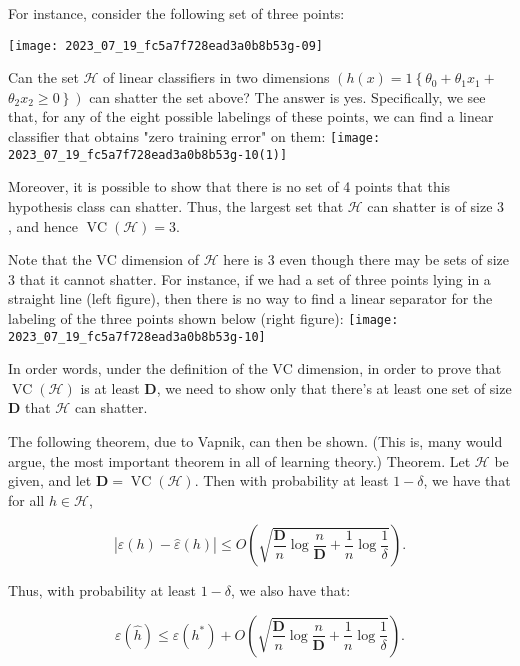 \documentclass[10pt]{article}
\begin{document}
For instance, consider the following set of three points:

\begin{center}
\texttt{[image: 2023\_07\_19\_fc5a7f728ead3a0b8b53g-09]}
\end{center}

Can the set \(\mathcal{H}\) of linear classifiers in two dimensions \(\left(h(x)=1\left\{\theta_{0}+\theta_{1} x_{1}+\right.\right.\) \(\left.\left.\theta_{2} x_{2} \geq 0\right\}\right)\) can shatter the set above? The answer is yes. Specifically, we see that, for any of the eight possible labelings of these points, we can find a linear classifier that obtains "zero training error" on them:
\texttt{[image: 2023\_07\_19\_fc5a7f728ead3a0b8b53g-10(1)]}

Moreover, it is possible to show that there is no set of 4 points that this hypothesis class can shatter. Thus, the largest set that \(\mathcal{H}\) can shatter is of size 3 , and hence \(\operatorname{VC}(\mathcal{H})=3\).

Note that the \(\mathrm{VC}\) dimension of \(\mathcal{H}\) here is 3 even though there may be sets of size 3 that it cannot shatter. For instance, if we had a set of three points lying in a straight line (left figure), then there is no way to find a linear separator for the labeling of the three points shown below (right figure):
\texttt{[image: 2023\_07\_19\_fc5a7f728ead3a0b8b53g-10]}

In order words, under the definition of the \(\mathrm{VC}\) dimension, in order to prove that \(\operatorname{VC}(\mathcal{H})\) is at least \(\mathbf{D}\), we need to show only that there's at least one set of size \(\mathbf{D}\) that \(\mathcal{H}\) can shatter.

The following theorem, due to Vapnik, can then be shown. (This is, many would argue, the most important theorem in all of learning theory.) Theorem. Let \(\mathcal{H}\) be given, and let \(\mathbf{D}=\operatorname{VC}(\mathcal{H})\). Then with probability at least \(1-\delta\), we have that for all \(h \in \mathcal{H}\),

\[
|\varepsilon(h)-\hat{\varepsilon}(h)| \leq O\left(\sqrt{\frac{\mathbf{D}}{n} \log \frac{n}{\mathbf{D}}+\frac{1}{n} \log \frac{1}{\delta}}\right) .
\]

Thus, with probability at least \(1-\delta\), we also have that:

\[
\varepsilon(\hat{h}) \leq \varepsilon\left(h^{*}\right)+O\left(\sqrt{\frac{\mathbf{D}}{n} \log \frac{n}{\mathbf{D}}+\frac{1}{n} \log \frac{1}{\delta}}\right) .
\]
\end{document}
